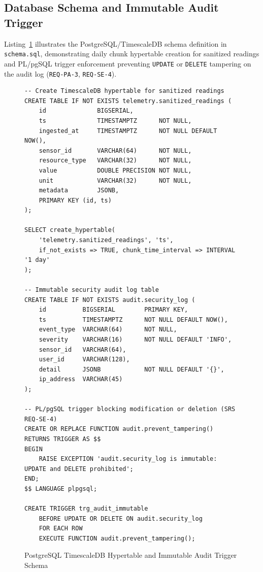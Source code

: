 \subsection{Database Schema and Immutable Audit Trigger}
Listing~\ref{lst:database_schema_sql} illustrates the PostgreSQL/TimescaleDB schema definition in \texttt{schema.sql}, demonstrating daily chunk hypertable creation for sanitized readings and PL/pgSQL trigger enforcement preventing \texttt{UPDATE} or \texttt{DELETE} tampering on the audit log (\texttt{REQ-PA-3}, \texttt{REQ-SE-4}).

\begin{figure}[H]
\centering
\begin{minipage}{0.95\linewidth}
\begin{verbatim}
-- Create TimescaleDB hypertable for sanitized readings
CREATE TABLE IF NOT EXISTS telemetry.sanitized_readings (
    id              BIGSERIAL,
    ts              TIMESTAMPTZ      NOT NULL,
    ingested_at     TIMESTAMPTZ      NOT NULL DEFAULT NOW(),
    sensor_id       VARCHAR(64)      NOT NULL,
    resource_type   VARCHAR(32)      NOT NULL,
    value           DOUBLE PRECISION NOT NULL,
    unit            VARCHAR(32)      NOT NULL,
    metadata        JSONB,
    PRIMARY KEY (id, ts)
);

SELECT create_hypertable(
    'telemetry.sanitized_readings', 'ts',
    if_not_exists => TRUE, chunk_time_interval => INTERVAL '1 day'
);

-- Immutable security audit log table
CREATE TABLE IF NOT EXISTS audit.security_log (
    id          BIGSERIAL        PRIMARY KEY,
    ts          TIMESTAMPTZ      NOT NULL DEFAULT NOW(),
    event_type  VARCHAR(64)      NOT NULL,
    severity    VARCHAR(16)      NOT NULL DEFAULT 'INFO',
    sensor_id   VARCHAR(64),
    user_id     VARCHAR(128),
    detail      JSONB            NOT NULL DEFAULT '{}',
    ip_address  VARCHAR(45)
);

-- PL/pgSQL trigger blocking modification or deletion (SRS REQ-SE-4)
CREATE OR REPLACE FUNCTION audit.prevent_tampering()
RETURNS TRIGGER AS $$
BEGIN
    RAISE EXCEPTION 'audit.security_log is immutable: UPDATE and DELETE prohibited';
END;
$$ LANGUAGE plpgsql;

CREATE TRIGGER trg_audit_immutable
    BEFORE UPDATE OR DELETE ON audit.security_log
    FOR EACH ROW
    EXECUTE FUNCTION audit.prevent_tampering();
\end{verbatim}
\end{minipage}
\caption{PostgreSQL TimescaleDB Hypertable and Immutable Audit Trigger Schema}
\label{lst:database_schema_sql}
\end{figure}

